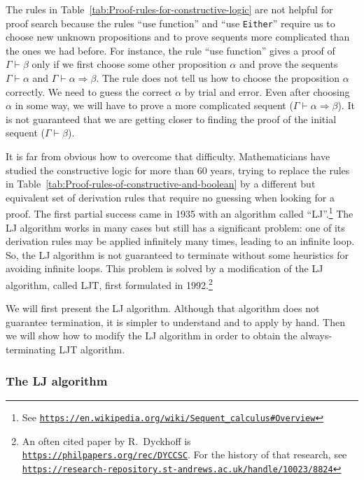 The rules in Table~\ref{tab:Proof-rules-for-constructive-logic}
are not helpful for proof search because the rules \textsf{``}use function\textsf{''}
and \textsf{``}use \lstinline!Either!\textsf{''} require us to choose new unknown
propositions and to prove sequents more complicated than the ones
we had before. For instance, the rule \textsf{``}use function\textsf{''} gives a proof
of $\Gamma\vdash\beta$ only if we first choose some other proposition
$\alpha$ and prove the sequents $\Gamma\vdash\alpha$ and $\Gamma\vdash\alpha\Rightarrow\beta$.
The rule does not tell us how to choose the proposition $\alpha$
correctly. We need to guess the correct $\alpha$ by trial and error.
Even after choosing $\alpha$ in some way, we will have to prove a
more complicated sequent ($\Gamma\vdash\alpha\Rightarrow\beta$).
It is not guaranteed that we are getting closer to finding the proof
of the initial sequent ($\Gamma\vdash\beta$). 

It is far from obvious how to overcome that difficulty. Mathematicians
have studied the constructive logic for more than 60 years, trying
to replace the rules in Table~\ref{tab:Proof-rules-of-constructive-and-boolean}
by a different but equivalent set of derivation rules that require
no guessing when looking for a proof. The first partial success came
in 1935 with an algorithm called \textsf{``}LJ\textsf{''}.\footnote{See \texttt{\href{https://en.wikipedia.org/wiki/Sequent_calculus\#Overview}{https://en.wikipedia.org/wiki/Sequent\_calculus\#Overview}}}
The LJ algorithm works in many cases but still has a significant problem:
one of its derivation rules may be applied infinitely many times,
leading to an infinite loop. So, the LJ algorithm is not guaranteed
to terminate without some heuristics for avoiding infinite loops.
This problem is solved by a modification of the LJ algorithm, called
LJT, first formulated in 1992.\footnote{An often cited paper by R.~Dyckhoff is \texttt{\href{https://philpapers.org/rec/DYCCSC}{https://philpapers.org/rec/DYCCSC}}.
For the history of that research, see \texttt{\href{https://research-repository.st-andrews.ac.uk/handle/10023/8824}{https://research-repository.st-andrews.ac.uk/handle/10023/8824}}} 

We will first present the LJ algorithm. Although that algorithm does
not guarantee termination, it is simpler to understand and to apply
by hand. Then we will show how to modify the LJ algorithm in order
to obtain the always-terminating LJT algorithm.

\subsubsection*{The LJ algorithm}

